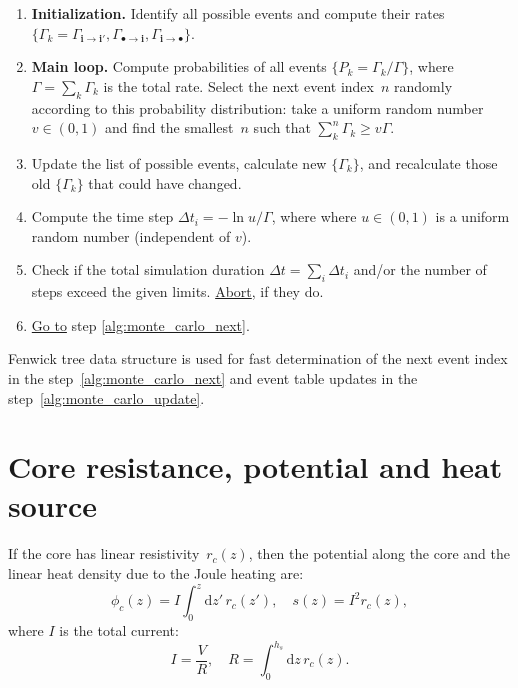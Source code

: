 \documentclass[10pt]{article}
\newcommand{\dd}{\mathrm{d}}
\renewcommand{\vec}[1]{\mathbf{#1}}
\newcommand{\vi}{\vec{i}}
\begin{document}
\begin{enumerate}
	\item \textbf{Initialization.} Identify all possible events and compute their rates
		  $\{ \Gamma_k = \Gamma_{\vi \to \vi'}, \Gamma_{\bullet \to \vi},
		  \Gamma_{\vi \to \bullet} \}$.

	\item \label{alg:monte_carlo_next} \textbf{Main loop.} Compute probabilities
		  of all events $\{ P_k = \Gamma_k / \Gamma \}$, where
		  $\Gamma = \sum_k \Gamma_k$ is the total rate. Select the next event
		  index~$n$ randomly according to this probability distribution: take
		  a uniform random number $v \in (0, 1)$ and find the smallest~$n$
		  such that $\sum_k^n \Gamma_k \geq v\Gamma$.

	\item \label{alg:monte_carlo_update} Update the list of possible events,
		  calculate new $\{ \Gamma_k \}$, and recalculate those old
		  $\{ \Gamma_k \}$ that could have changed.

	\item Compute the time step $\Delta t_i = -\ln u / \Gamma$, where where
		  $u \in (0, 1)$ is a uniform random number (independent of $v$).

	\item Check if the total simulation duration $\Delta t = \sum_i \Delta t_i$
		  and/or the number of steps exceed the given limits. \underline{Abort},
		  if they do.

	\item \underline{Go to} step \ref{alg:monte_carlo_next}.
\end{enumerate}

Fenwick tree data structure is used for fast determination of the next event
index in the step~\ref{alg:monte_carlo_next} and event table updates in the
step~\ref{alg:monte_carlo_update}.

\section{Core resistance, potential and heat source}

If the core has linear resistivity~$r_c(z)$, then the potential along the core
and the linear heat density due to the Joule heating are:
\begin{equation}
	\phi_c(z) = I \int_0^z \dd z'\, r_c(z'), \quad
	s(z) = I^2 r_c(z),
\end{equation}
where $I$ is the total current:
\begin{equation}
	I = \frac{V}{R}, \quad R = \int_0^{h_s} \dd z\, r_c(z).
\end{equation}
\end{document}
